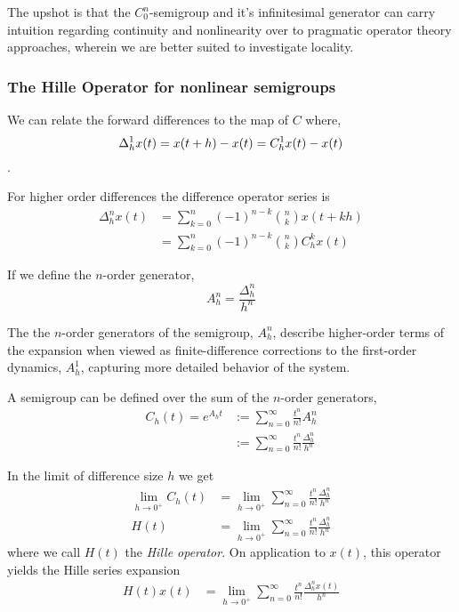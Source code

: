 \documentclass{article}
\begin{document}
The upshot is that the $C^n_0$-semigroup and it's infinitesimal generator can carry intuition regarding continuity and nonlinearity over to pragmatic operator theory approaches, wherein we are better suited to investigate locality.

\subsubsection{The Hille Operator for nonlinear semigroups}

We can relate the forward differences to the map of $C$ where,
$$
    \Delta_h^1 x(t) = x(t+h) - x(t) = C_h^1 x(t) - x(t)\\
$$. 

For higher order differences the difference operator series is
\begin{align}
    \Delta_h^n x(t) &= \sum_{k=0}^n (-1)^{n-k} {n \choose k} x(t+kh) \nonumber \\
    &= \sum_{k=0}^n (-1)^{n-k} {n \choose k} C_h^k x(t) \label{eq:delta_c}
\end{align}

If we define the $n$-order generator,
$$
    A_h^n = \frac{\Delta_h^n}{h^n}
$$

The the $n$-order generators of the semigroup, $A_h^n$, describe higher-order terms of the expansion when viewed as finite-difference corrections to the first-order dynamics, $A_h^1$, capturing more detailed behavior of the system.

A semigroup can be defined over the sum of the $n$-order generators,
\begin{align}
    C_h(t) = e^{A_h t} &:= \sum_{n=0}^\infty \frac{t^n}{n!} A^n_h \nonumber\\
    &:= \sum_{n=0}^\infty \frac{t^n}{n!} \frac{\Delta_h^n}{h^n} \label{eq:hille_operator}
\end{align}

In the limit of difference size $h$ we get
\begin{align*}
    \lim_{h\rightarrow0^+} C_h(t) &= \lim_{h\rightarrow0^+} \sum_{n=0}^\infty \frac{t^n}{n!} \frac{\Delta_h^n}{h^n}\\
    H(t) &= \lim_{h\rightarrow0^+} \sum_{n=0}^\infty \frac{t^n}{n!} \frac{\Delta_h^n}{h^n}
\end{align*}
where we call $H(t)$ the \textit{Hille operator}. On application to $x(t)$, this operator yields the Hille series expansion
\begin{align*}
    H(t) x(t) &= \lim_{h\rightarrow0^+} \sum_{n=0}^\infty \frac{t^n}{n!} \frac{\Delta_h^n x(t)}{h^n} 
\end{align*}
\end{document}
